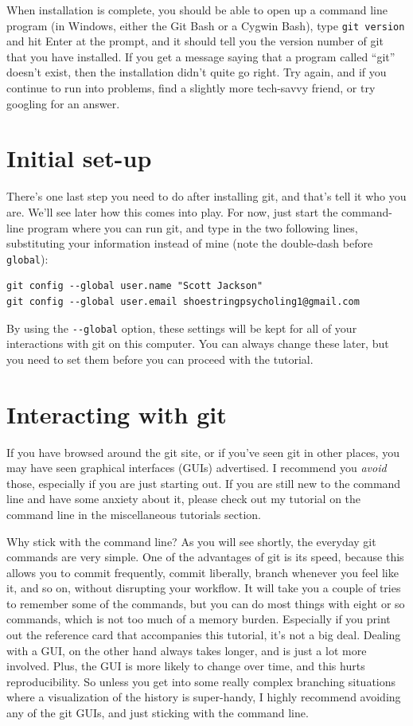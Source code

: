 \documentclass{article}
\begin{document}
When installation is complete, you should be able to open up a command line program (in Windows, either the Git Bash or a Cygwin Bash), type \texttt{git version} and hit Enter at the prompt, and it should tell you the version number of git that you have installed. If you get a message saying that a program called ``git'' doesn't exist, then the installation didn't quite go right.  Try again, and if you continue to run into problems, find a slightly more tech-savvy friend, or try googling for an answer.
\section{Initial set-up}
\label{sec-3}

There's one last step you need to do after installing git, and that's tell it who you are.  We'll see later how this comes into play. For now, just start the command-line program where you can run git, and type in the two following lines, substituting your information instead of mine (note the double-dash before \texttt{global}):


\begin{verbatim}
git config --global user.name "Scott Jackson"
git config --global user.email shoestringpsycholing1@gmail.com
\end{verbatim}

By using the \texttt{-{}-global} option, these settings will be kept for all of your interactions with git on this computer. You can always change these later, but you need to set them before you can proceed with the tutorial.
\section{Interacting with git}
\label{sec-4}

If you have browsed around the git site, or if you've seen git in other places, you may have seen graphical interfaces (GUIs) advertised.  I recommend you \emph{avoid} those, especially if you are just starting out. If you are still new to the command line and have some anxiety about it, please check out my tutorial on the command line in the miscellaneous tutorials section.

Why stick with the command line? As you will see shortly, the everyday git commands are very simple. One of the advantages of git is its speed, because this allows you to commit frequently, commit liberally, branch whenever you feel like it, and so on, without disrupting your workflow. It will take you a couple of tries to remember some of the commands, but you can do most things with eight or so commands, which is not too much of a memory burden.  Especially if you print out the reference card that accompanies this tutorial, it's not a big deal.  Dealing with a GUI, on the other hand always takes longer, and is just a lot more involved. Plus, the GUI is more likely to change over time, and this hurts reproducibility. So unless you get into some really complex branching situations where a visualization of the history is super-handy, I highly recommend avoiding any of the git GUIs, and just sticking with the command line.
\end{document}
